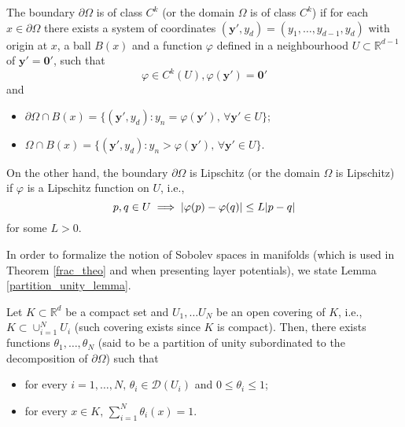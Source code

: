 \begin{definition}\label{ck_lipschitz_domains_def}
    The boundary \(\partial\Omega\) is of class \(C^k\) (or the domain \(\Omega\) is of class \(C^k\)) if for each \(x \in \partial\Omega\) there exists a system of coordinates \((\mathbf{y}', y_d)= (y_1,\dots,y_{d-1},y_d)\) with origin at \(x\), a ball \(B(x)\) and a function \(\varphi\) defined in a neighbourhood \(U \subset \mathbb{R}^{d-1}\) of \(\mathbf{y}'=\mathbf{0}'\), such that
    \[
        \varphi \in C^k(U), \varphi(\mathbf{y}') = \mathbf{0}'
    \]
    and
    \begin{itemize}
        \item \(\partial\Omega \cap B(x) = \{(\mathbf{y}', y_d): y_n = \varphi(\mathbf{y}'), \, \forall \mathbf{y}' \in U\}\);
        \item \(\Omega \cap B(x) = \{(\mathbf{y}', y_d): y_n > \varphi(\mathbf{y}'), \, \forall \mathbf{y}' \in U\}\).
    \end{itemize}

        On the other hand, the boundary \(\partial\Omega\) is Lipschitz (or the domain \(\Omega\) is Lipschitz) if \(\varphi\) is a Lipschitz function on \(U\), i.e.,
    \[
        p, q \in U \implies  \abs{\varphi(p) - \varphi(q)} \leq L \abs{p-q}
    \]
    for some \(L > 0\).
\end{definition}

In order to formalize the notion of Sobolev spaces in manifolds (which is used in Theorem \ref{frac_theo} and when presenting layer potentials), we state Lemma \ref{partition_unity_lemma}.

\begin{lemma}\label{partition_unity_lemma}
    Let \(K \subset \mathbb{R}^d\) be a compact set and \(U_1,\dots U_N\) be an open covering of \(K\), i.e., \(K \subset \cup_{i=1}^N U_i\) (such covering exists since \(K\) is compact). Then, there exists functions \(\theta_1,\dots, \theta_N\) (said to be a partition of unity subordinated to the decomposition of \(\partial\Omega\)) such that
    \begin{itemize}
        \item for every \(i=1,\dots,N, \, \theta_i \in \mathcal{D}(U_i)\) and \(0 \leq \theta_i \leq 1\);
        \item for every \(x \in K, \, \sum_{i=1}^{N}\theta_i(x) = 1\).  
    \end{itemize}
\end{lemma}

